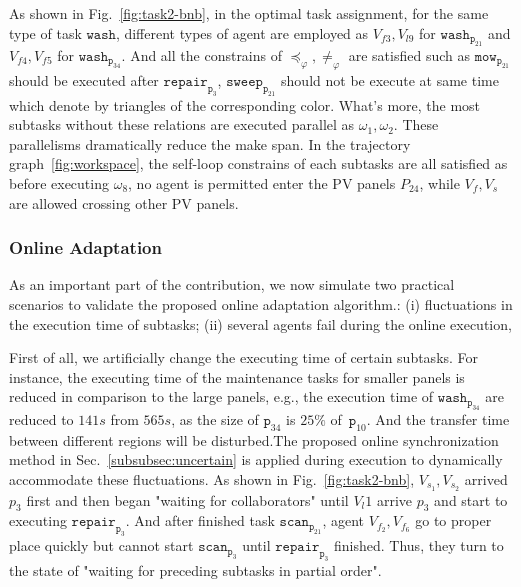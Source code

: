 As shown in Fig.~\ref{fig:task2-bnb},
in the optimal task assignment, for the same type of task $\texttt{wash}$,
different types of agent are employed as $V_{f3},V_{l9}$ for $\texttt{wash}_{\texttt{p}_{21}}$ and
 $V_{f4},V_{f5}$ for $\texttt{wash}_{\texttt{p}_{34}}$. And all the constrains
 of $\preceq_\varphi,\neq_\varphi$ are satisfied such as $\texttt{mow}_{\texttt{p}_{21}}$
should be executed after $\texttt{repair}_{\texttt{p}_3}$, $\texttt{sweep}_{\texttt{p}_21}$
should not be execute at same time which denote by triangles of the corresponding color.
What's more, the most subtasks without these relations are executed parallel as $\omega_1,\omega_2$.
These parallelisms dramatically reduce the make span.
In the trajectory graph~\ref{fig:workspace}, the self-loop constrains of each subtasks are all satisfied
as before executing $\omega_8$, no agent is permitted enter the PV panels $P_{24}$, while $V_f, V_s$ are allowed
crossing other PV panels.




\subsubsection{Online Adaptation}\label{subsubsec:exp-adapt}
As an important part of the contribution, we now simulate
two practical scenarios to validate the proposed online adaptation algorithm.:
(i) fluctuations in the execution time of subtasks;
(ii) several agents fail during the online execution,

First of all, we artificially change the executing time of certain subtasks.
For instance, the executing time of the maintenance tasks for smaller panels
is reduced in comparison to the large panels, e.g., the execution time
of $\texttt{wash}_{\texttt{p}_{34}}$ are reduced to $141s$ from $565s$, as the size
of $\texttt{p}_{34}$ is $25\%$ of~$\texttt{p}_{10}$. And the transfer time
between different regions will be disturbed.The proposed online synchronization method in
 Sec.~\ref{subsubsec:uncertain} is applied during execution to dynamically accommodate these fluctuations.
 As shown in Fig.~\ref{fig:task2-bnb}, $V_{s_1}, V_{s_2}$ arrived $p_3$ first
and then began "waiting for collaborators" until $V_l1$ arrive $p_3$ and start to executing
  $\texttt{repair}_{\texttt{p}_3}$. And after finished task $\texttt{scan}_{\texttt{p}_{21}}$,
  agent $V_{f_2},V_{f_6}$ go to proper place quickly but cannot start $\texttt{scan}_{\texttt{p}_3}$
  until $\texttt{repair}_{\texttt{p}_3}$ finished. Thus, they turn to the state of "waiting for preceding subtasks
  in partial order".




